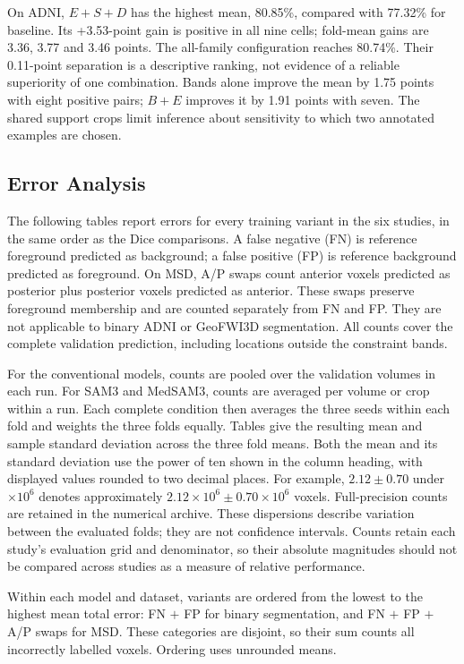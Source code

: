 \documentclass[12pt,a4paper]{article}
\begin{document}
On ADNI, $E+S+D$ has the highest mean, 80.85\%, compared with 77.32\%
for baseline. Its +3.53-point gain is positive in all nine cells;
fold-mean gains are 3.36, 3.77 and 3.46 points. The all-family
configuration reaches 80.74\%. Their 0.11-point separation is a
descriptive ranking, not evidence of a reliable superiority of one
combination. Bands alone improve the mean by 1.75 points with eight
positive pairs; $B+E$ improves it by 1.91 points with seven. The
shared support crops limit inference about sensitivity to which two
annotated examples are chosen.

\FloatBarrier
\subsection{Error Analysis}
\label{sec:error-analysis}
\label{sec:capped-errors-resources}

The following tables report errors for every training variant in the
six studies, in the same order as the Dice comparisons. A false negative
(FN) is reference foreground predicted as background; a false positive
(FP) is reference background predicted as foreground. On MSD, A/P swaps
count anterior voxels predicted as posterior plus posterior voxels
predicted as anterior. These swaps preserve foreground membership and
are counted separately from FN and FP. They are not applicable
to binary ADNI or GeoFWI3D segmentation. All counts cover the complete
validation prediction, including locations outside the constraint bands.

For the conventional models, counts are pooled over the validation
volumes in each run. For SAM3 and MedSAM3, counts are averaged per volume
or crop within a run. Each complete condition then averages the three
seeds within each fold and weights the three folds equally. Tables give
the resulting mean and sample standard deviation across the three fold
means. Both the mean and its standard deviation use the power of ten
shown in the column heading, with displayed values rounded to two decimal
places. For example, $2.12\pm0.70$ under $\times10^6$ denotes
approximately $2.12\times10^6\pm0.70\times10^6$ voxels. Full-precision
counts are retained in the numerical archive.
These dispersions describe variation between the evaluated folds;
they are not confidence intervals. Counts retain each study's evaluation
grid and denominator, so their absolute magnitudes should not be compared
across studies as a measure of relative performance.

Within each model and dataset, variants are ordered from the lowest to
the highest mean total error: FN $+$ FP for binary segmentation, and
FN $+$ FP $+$ A/P swaps for MSD. These categories are disjoint, so their
sum counts all incorrectly labelled voxels. Ordering uses unrounded
means.
\end{document}
